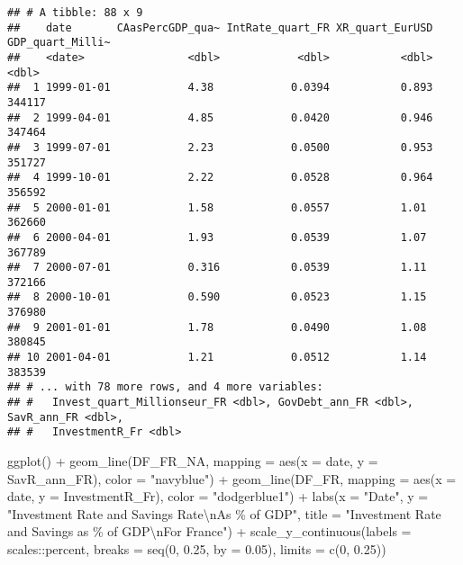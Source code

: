 \documentclass[
]{article}
\newenvironment{Shaded}{\begin{snugshade}}{\end{snugshade}}
\newcommand{\AttributeTok}[1]{\textcolor[rgb]{0.77,0.63,0.00}{#1}}
\newcommand{\DecValTok}[1]{\textcolor[rgb]{0.00,0.00,0.81}{#1}}
\newcommand{\FloatTok}[1]{\textcolor[rgb]{0.00,0.00,0.81}{#1}}
\newcommand{\FunctionTok}[1]{\textcolor[rgb]{0.00,0.00,0.00}{#1}}
\newcommand{\NormalTok}[1]{#1}
\newcommand{\SpecialCharTok}[1]{\textcolor[rgb]{0.00,0.00,0.00}{#1}}
\newcommand{\StringTok}[1]{\textcolor[rgb]{0.31,0.60,0.02}{#1}}
\begin{document}
\begin{verbatim}
## # A tibble: 88 x 9
##    date       CAasPercGDP_qua~ IntRate_quart_FR XR_quart_EurUSD GDP_quart_Milli~
##    <date>                <dbl>            <dbl>           <dbl>            <dbl>
##  1 1999-01-01            4.38            0.0394           0.893           344117
##  2 1999-04-01            4.85            0.0420           0.946           347464
##  3 1999-07-01            2.23            0.0500           0.953           351727
##  4 1999-10-01            2.22            0.0528           0.964           356592
##  5 2000-01-01            1.58            0.0557           1.01            362660
##  6 2000-04-01            1.93            0.0539           1.07            367789
##  7 2000-07-01            0.316           0.0539           1.11            372166
##  8 2000-10-01            0.590           0.0523           1.15            376980
##  9 2001-01-01            1.78            0.0490           1.08            380845
## 10 2001-04-01            1.21            0.0512           1.14            383539
## # ... with 78 more rows, and 4 more variables:
## #   Invest_quart_Millionseur_FR <dbl>, GovDebt_ann_FR <dbl>, SavR_ann_FR <dbl>,
## #   InvestmentR_Fr <dbl>
\end{verbatim}

\begin{Shaded}
\begin{Highlighting}[]
\FunctionTok{ggplot}\NormalTok{() }\SpecialCharTok{+} 
  \FunctionTok{geom\_line}\NormalTok{(DF\_FR\_NA, }\AttributeTok{mapping =} \FunctionTok{aes}\NormalTok{(}\AttributeTok{x =}\NormalTok{ date, }\AttributeTok{y =}\NormalTok{ SavR\_ann\_FR), }\AttributeTok{color =} \StringTok{"navyblue"}\NormalTok{) }\SpecialCharTok{+}
  \FunctionTok{geom\_line}\NormalTok{(DF\_FR, }\AttributeTok{mapping =} \FunctionTok{aes}\NormalTok{(}\AttributeTok{x =}\NormalTok{ date, }\AttributeTok{y =}\NormalTok{ InvestmentR\_Fr), }\AttributeTok{color =} \StringTok{"dodgerblue1"}\NormalTok{) }\SpecialCharTok{+}
  \FunctionTok{labs}\NormalTok{(}\AttributeTok{x =} \StringTok{"Date"}\NormalTok{, }\AttributeTok{y =} \StringTok{"Investment Rate and Savings Rate}\SpecialCharTok{\textbackslash{}n}\StringTok{As \% of GDP"}\NormalTok{, }\AttributeTok{title =} \StringTok{"Investment Rate and Savings as \% of GDP}\SpecialCharTok{\textbackslash{}n}\StringTok{For France"}\NormalTok{) }\SpecialCharTok{+}
  \FunctionTok{scale\_y\_continuous}\NormalTok{(}\AttributeTok{labels =}\NormalTok{ scales}\SpecialCharTok{::}\NormalTok{percent, }\AttributeTok{breaks =} \FunctionTok{seq}\NormalTok{(}\DecValTok{0}\NormalTok{, }\FloatTok{0.25}\NormalTok{, }\AttributeTok{by =} \FloatTok{0.05}\NormalTok{), }\AttributeTok{limits =} \FunctionTok{c}\NormalTok{(}\DecValTok{0}\NormalTok{, }\FloatTok{0.25}\NormalTok{))}
\end{Highlighting}
\end{Shaded}
\end{document}
